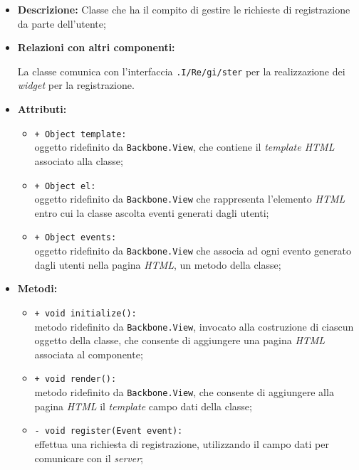 \begin{flushleft}
\begin{itemize}
\item \textbf{Descrizione:} Classe che ha il compito di gestire le richieste di registrazione da parte dell'utente;
\item \textbf{Relazioni con altri componenti:}
\begin{sloppypar}
La classe comunica con l'interfaccia \texttt{\viewUser{}.I\fshyp{}Re\fshyp{}gi\fshyp{}ster} per la realizzazione dei \textit{widget} per la registrazione.
\end{sloppypar}
\item \textbf{Attributi:}
\begin{sloppypar}
\begin{itemize}
\item \texttt{+ Object template:}\\ oggetto ridefinito da \texttt{Backbone.View}, che contiene il \textit{template HTML} associato alla classe;
\item \texttt{+ Object el:}\\ oggetto ridefinito da \texttt{Backbone.View} che rappresenta l'elemento \textit{HTML} entro cui la classe ascolta eventi generati dagli utenti;
\item \texttt{+ Object events:}\\ oggetto ridefinito da \texttt{Backbone.View} che associa ad ogni evento generato dagli utenti nella pagina \textit{HTML}, un metodo della classe;
\end{itemize}
\end{sloppypar}
\item \textbf{Metodi:}
\begin{sloppypar}
\begin{itemize}
\item \texttt{+ void initialize():}\\ metodo ridefinito da \texttt{Backbone.View}, invocato alla costruzione di ciascun oggetto della classe, che consente di aggiungere una pagina \textit{HTML} associata al componente;
\item \texttt{+ void render():}\\ metodo ridefinito da \texttt{Backbone.View}, che consente di aggiungere alla pagina \textit{HTML} il \textit{template} campo dati della classe;
\item \texttt{- void register(Event event):}\\ effettua una richiesta di registrazione, utilizzando il campo dati \model{} per comunicare con il \textit{server};

\end{itemize}
\end{sloppypar}
\end{itemize}
\end{flushleft}
